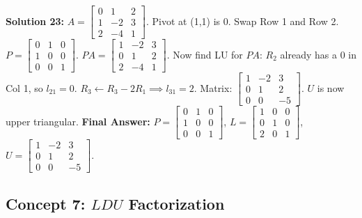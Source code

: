 \documentclass[11pt]{article}
\begin{document}
\vspace{0.5cm}
\textbf{Solution 23:}
$A = \begin{bmatrix} 0 & 1 & 2 \\ 1 & -2 & 3 \\ 2 & -4 & 1 \end{bmatrix}$. Pivot at (1,1) is 0. Swap Row 1 and Row 2.
$P = \begin{bmatrix} 0 & 1 & 0 \\ 1 & 0 & 0 \\ 0 & 0 & 1 \end{bmatrix}$.
$PA = \begin{bmatrix} 1 & -2 & 3 \\ 0 & 1 & 2 \\ 2 & -4 & 1 \end{bmatrix}$.
Now find LU for $PA$:
$R_2$ already has a 0 in Col 1, so $l_{21} = 0$.
$R_3 \leftarrow R_3 - 2R_1 \implies l_{31} = 2$. Matrix: $\begin{bmatrix} 1 & -2 & 3 \\ 0 & 1 & 2 \\ 0 & 0 & -5 \end{bmatrix}$.
$U$ is now upper triangular.
\textbf{Final Answer:} $P = \begin{bmatrix} 0 & 1 & 0 \\ 1 & 0 & 0 \\ 0 & 0 & 1 \end{bmatrix}$, $L = \begin{bmatrix} 1 & 0 & 0 \\ 0 & 1 & 0 \\ 2 & 0 & 1 \end{bmatrix}$, $U = \begin{bmatrix} 1 & -2 & 3 \\ 0 & 1 & 2 \\ 0 & 0 & -5 \end{bmatrix}$.

\subsection*{Concept 7: $LDU$ Factorization}
\end{document}
